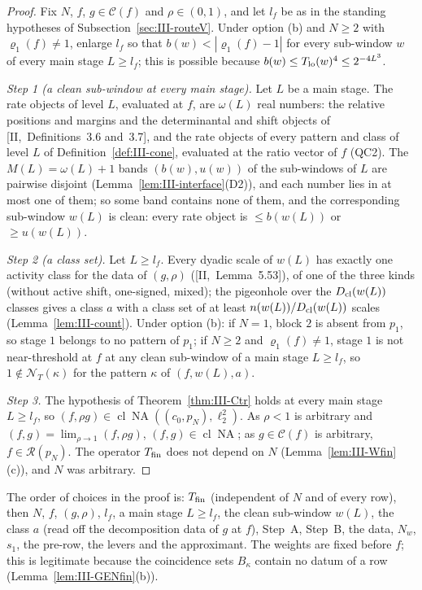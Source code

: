\documentclass[10pt]{amsart}
\theoremstyle{definition}
\theoremstyle{remark}
\newcommand{\NA}{\operatorname{NA}}
\newcommand{\Cset}{\mathcal C}
\newcommand{\cl}{\operatorname{cl}}
\newcommand{\Rec}{\mathcal R}
\begin{document}
\begin{proof}
Fix $N$, $f$, $g\in\Cset(f)$ and $\rho\in(0,1)$, and let $l_f$ be as in the
standing hypotheses of Subsection~\ref{sec:III-routeV}.  Under option (b) and
$N\ge2$ with $\varrho_1(f)\ne1$, enlarge $l_f$ so that $b(w)<|\varrho_1(f)-1|$ for
every sub-window $w$ of every main stage $L\ge l_f$; this is possible because
$b(w)\le T_{\rm lo}(w)^4\le2^{-4L^3}$.

\emph{Step 1 (a clean sub-window at every main stage).}  Let $L$ be a main stage.
The rate objects of level $L$, evaluated at $f$, are $\omega(L)$ real numbers:
the relative positions and margins and the determinantal and shift objects of
[II,~Definitions~3.6 and~3.7], and the rate objects of every pattern and class
of level $L$ of Definition~\ref{def:III-cone}, evaluated at the ratio vector
of $f$ (QC2).  The $M(L)=\omega(L)+1$ bands $(b(w),u(w))$ of the sub-windows of
$L$ are pairwise disjoint (Lemma~\ref{lem:III-interface}(D2)), and each number
lies in at most one of them; so some band contains none of them, and the
corresponding sub-window $w(L)$ is clean: every rate object is $\le b(w(L))$ or
$\ge u(w(L))$.

\emph{Step 2 (a class set).}  Let $L\ge l_f$.  Every dyadic scale of $w(L)$ has
exactly one activity class for the data of $(g,\rho)$ ([II,~Lemma~5.53]), of one
of the three kinds (without active shift, one-signed, mixed); the
pigeonhole over the $D_{\rm cl}(w(L))$ classes gives a class $a$ with a class set
of at least $n(w(L))/D_{\rm cl}(w(L))$ scales (Lemma~\ref{lem:III-count}).  Under
option (b): if $N=1$, block $2$ is absent from $p_1$, so stage $1$ belongs to no
pattern of $p_1$; if $N\ge2$ and $\varrho_1(f)\ne1$, stage $1$ is not
near-threshold at $f$ at any clean sub-window of a main stage $L\ge l_f$, so
$1\notin\mathcal N_T(\kappa)$ for the pattern $\kappa$ of $(f,w(L),a)$.

\emph{Step 3.}  The hypothesis of Theorem~\ref{thm:III-Ctr} holds at every main
stage $L\ge l_f$, so $(f,\rho g)\in\cl\NA((c_0,p_N),\ell_2^2)$.  As $\rho<1$ is
arbitrary and $(f,g)=\lim_{\rho\to1}(f,\rho g)$, $(f,g)\in\cl\NA$; as $g\in\Cset(f)$
is arbitrary, $f\in\Rec(p_N)$.  The operator $T_{\rm fin}$ does not depend on $N$
(Lemma~\ref{lem:III-Wfin}(c)), and $N$ was arbitrary.
\end{proof}

The order of choices in the proof is: $T_{\rm fin}$ (independent of $N$ and of
every row), then $N$, $f$, $(g,\rho)$, $l_f$, a main stage $L\ge l_f$, the clean
sub-window $w(L)$, the class $a$ (read off the decomposition data of $g$ at
$f$), Step~A, Step~B, the data, $N_w$, $s_1$, the pre-row, the levers and the
approximant.  The weights are fixed before $f$; this is legitimate because the
coincidence sets $B_\kappa$ contain no datum of a row
(Lemma~\ref{lem:III-GENfin}(b)).
\end{document}
